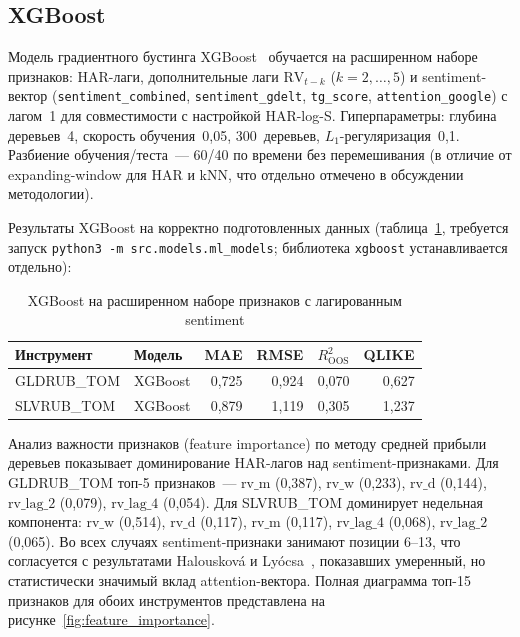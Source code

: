\subsection{XGBoost}

Модель градиентного бустинга XGBoost~\cite{Chen2016} обучается на
расширенном наборе признаков: HAR-лаги, дополнительные лаги
$\mathrm{RV}_{t-k}$ ($k=2,\ldots,5$) и sentiment-вектор
(\texttt{sentiment\_combined}, \texttt{sentiment\_gdelt},
\texttt{tg\_score}, \texttt{attention\_google})
с лагом~1 для совместимости с настройкой HAR-log-S.
Гиперпараметры: глубина деревьев~4, скорость обучения~0{,}05,
300~деревьев, $L_1$-регуляризация~0{,}1.
Разбиение обучения/теста~--- 60/40 по времени без перемешивания
(в отличие от expanding-window для HAR и kNN, что отдельно отмечено
в обсуждении методологии).

Результаты XGBoost на корректно подготовленных данных
(таблица~\ref{tab:xgb_results}, требуется запуск
\texttt{python3 -m src.models.ml\_models}; библиотека
\texttt{xgboost} устанавливается отдельно):

\begin{table}[h!]
\centering
\caption{XGBoost на расширенном наборе признаков с лагированным sentiment}
\label{tab:xgb_results}
\begin{tabular}{llrrrr}
\hline
Инструмент & Модель & MAE & RMSE & $R^2_{\mathrm{OOS}}$ & QLIKE \\
\hline
GLDRUB\_TOM & XGBoost & 0{,}725 & 0{,}924 & 0{,}070 & 0{,}627 \\
SLVRUB\_TOM & XGBoost & 0{,}879 & 1{,}119 & 0{,}305 & 1{,}237 \\
\hline
\end{tabular}
\end{table}

Анализ важности признаков (feature importance) по методу средней прибыли деревьев
показывает доминирование HAR-лагов над sentiment-признаками.
Для GLDRUB\_TOM топ-5 признаков~---
$\mathrm{rv\_m}$ (0{,}387), $\mathrm{rv\_w}$ (0{,}233),
$\mathrm{rv\_d}$ (0{,}144), $\mathrm{rv\_lag\_2}$ (0{,}079),
$\mathrm{rv\_lag\_4}$ (0{,}054).
Для SLVRUB\_TOM доминирует недельная компонента:
$\mathrm{rv\_w}$ (0{,}514), $\mathrm{rv\_d}$ (0{,}117),
$\mathrm{rv\_m}$ (0{,}117), $\mathrm{rv\_lag\_4}$ (0{,}068),
$\mathrm{rv\_lag\_2}$ (0{,}065).
Во всех случаях sentiment-признаки занимают позиции 6--13,
что согласуется с результатами Halousková и Lyócsa~\cite{Halouskova2025},
показавших умеренный, но статистически значимый вклад attention-вектора.
Полная диаграмма топ-15 признаков для обоих инструментов представлена
на рисунке~\ref{fig:feature_importance}.


